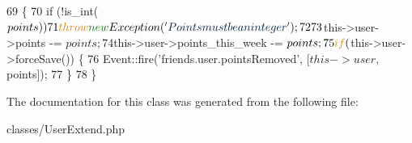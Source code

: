 \begin{DoxyCode}
69     \{
70         \textcolor{keywordflow}{if} (!is\_int($points))
71             \textcolor{keywordflow}{throw} \textcolor{keyword}{new} Exception(\textcolor{stringliteral}{'Points must be an integer'});
72 
73         $this->user->points -= $points;
74         $this->user->points\_this\_week -= $points;
75         \textcolor{keywordflow}{if} ($this->user->forceSave()) \{
76             Event::fire(\textcolor{stringliteral}{'friends.user.pointsRemoved'}, [$this->user, $points]);
77         \}
78     \}
\end{DoxyCode}


The documentation for this class was generated from the following file\+:\begin{DoxyCompactItemize}
\item 
classes/User\+Extend.\+php\end{DoxyCompactItemize}
